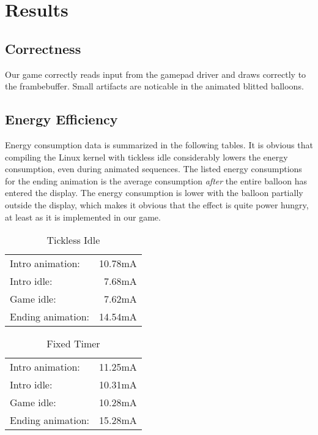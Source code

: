 \chapter{Results}

\section{Correctness}

Our game correctly reads input from the gamepad driver and draws correctly to
the frambebuffer. Small artifacts are noticable in the animated blitted
balloons.

\section{Energy Efficiency}

Energy consumption data is summarized in the following tables. It is obvious
that compiling the Linux kernel with tickless idle considerably lowers the
energy consumption, even during animated sequences. The listed energy
consumptions for the ending animation is the average consumption \emph{after}
the entire balloon has entered the display. The energy consumption is lower with
the balloon partially outside the display, which makes it obvious that the
effect is quite power hungry, at least as it is implemented in our game.
\begin{table}[h]
\caption{Tickless Idle}
\centering
\label{tab:tickless}
\begin{tabular}{l r}
	Intro animation:&10.78mA\\
	Intro idle:&7.68mA\\
	Game idle:&7.62mA\\
	Ending animation:&14.54mA
\end{tabular}
\end{table}
\begin{table}[h]
\caption{Fixed Timer}
\centering
\label{tab:fixed}
\begin{tabular}{l r}
	Intro animation:&11.25mA\\
	Intro idle:&10.31mA\\
	Game idle:&10.28mA\\
	Ending animation:&15.28mA
\end{tabular}
\end{table}
